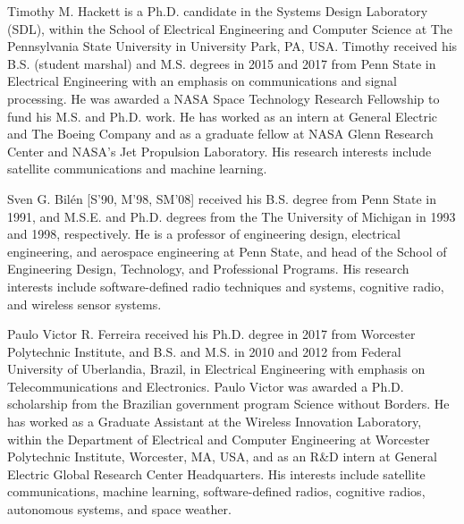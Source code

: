 \documentclass[journal]{IEEEtran}
\begin{document}
\begin{IEEEbiography}{Timothy M. Hackett}
is a Ph.D. candidate in the Systems Design Laboratory (SDL), within the School of Electrical Engineering and Computer Science at The Pennsylvania State University in University Park, PA, USA. Timothy received his B.S. (student marshal) and M.S. degrees in 2015 and 2017 from Penn State in Electrical Engineering with an emphasis on communications and signal processing. He was awarded a NASA Space Technology Research Fellowship to fund his M.S. and Ph.D. work. He has worked as an intern at General Electric and The Boeing Company and as a graduate fellow at NASA Glenn Research Center and NASA's Jet Propulsion Laboratory. His research interests include satellite communications and machine learning.
\end{IEEEbiography}
\begin{IEEEbiography}{Sven G. Bil\'{e}n}
[S’90, M’98, SM’08] received his B.S. degree from Penn State in 1991, and M.S.E. and Ph.D. degrees from the The University of Michigan in 1993 and 1998, respectively. He is a professor of engineering design, electrical engineering, and aerospace engineering at Penn State, and head of the School of Engineering Design, Technology, and Professional Programs. His research interests include software-defined radio techniques and systems, cognitive radio, and wireless sensor systems.
\end{IEEEbiography}
\begin{IEEEbiography}{Paulo Victor R. Ferreira}
received his Ph.D. degree in 2017 from Worcester Polytechnic Institute, and B.S. and M.S. in 2010 and 2012 from Federal University of Uberlandia, Brazil, in Electrical Engineering with emphasis on Telecommunications and Electronics.  Paulo Victor was awarded a Ph.D. scholarship from the Brazilian government program Science without Borders. He has worked as a Graduate Assistant at the Wireless Innovation Laboratory, within the Department of Electrical and Computer Engineering at Worcester Polytechnic Institute, Worcester, MA, USA, and as an R\&D intern at General Electric Global Research Center Headquarters. His interests include satellite communications, machine learning, software-defined radios, cognitive radios, autonomous systems, and space weather.
\end{IEEEbiography}
\end{document}
